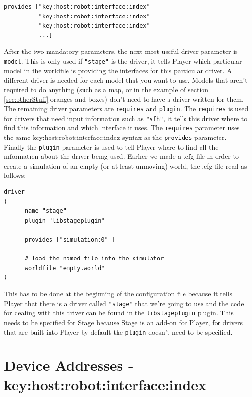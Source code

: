 \documentclass[a4paper]{report}
\newcommand{\pl}{Player\xspace}
\begin{document}
\begin{verbatim}
provides ["key:host:robot:interface:index" 
          "key:host:robot:interface:index"
          "key:host:robot:interface:index"
          ...]
\end{verbatim}

After the two mandatory parameters, the next most useful driver parameter is \verb|model|. This is only used if \verb|"stage"| is the driver, it tells \pl which particular model in the worldfile is providing the interfaces for this particular driver. A different driver is needed for each model that you want to use. Models that aren't required to do anything (such as a map, or in the example of section \ref{sec:otherStuff} oranges and boxes) don't need to have a driver written for them.\newline
The remaining driver parameters are \verb|requires| and \verb|plugin|. The \verb|requires| is used for drivers that need input information such as \verb|"vfh"|, it tells this driver where to find this information and which interface it uses. The \verb|requires| parameter uses the same key:host:robot:interface:index syntax as the \verb|provides| parameter. Finally the \verb|plugin| parameter is used to tell \pl where to find all the information about the driver being used. Earlier we made a .cfg file in order to create a simulation of an empty (or at least unmoving) world, the .cfg file read as follows:
\begin{verbatim}
driver
(		
      name "stage"
      plugin "libstageplugin"

      provides ["simulation:0" ]

      # load the named file into the simulator
      worldfile "empty.world"	
)
\end{verbatim}
This has to be done at the beginning of the configuration file because it tells \pl that there is a driver called \verb|"stage"| that we're going to use and the code for dealing with this driver can be found in the \verb|libstageplugin| plugin. This needs to be specified for Stage because Stage is an add-on for \pl, for drivers that are built into \pl by default the \verb|plugin| doesn't need to be specified.

\section{Device Addresses - key:host:robot:interface:index} \label{sec:deviceAddress}
\end{document}
